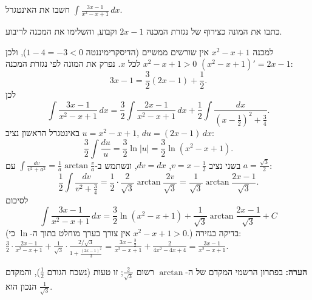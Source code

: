 
\begin{question}
חשבו את האינטגרל $\displaystyle\int\frac{3x-1}{x^2-x+1}\,dx$.
\end{question}

\begin{hint}
כתבו את המונה כצירוף של נגזרת המכנה $2x-1$ וקבוע, והשלימו את המכנה לריבוע.
\end{hint}

\begin{solution}
למכנה $x^2-x+1$ אין שורשים ממשיים (הדיסקרימיננטה $1-4=-3<0$), ולכן $x^2-x+1>0$ לכל $x$. נפרק את המונה לפי נגזרת המכנה $(x^2-x+1)'=2x-1$:
\[ 3x-1=\frac32(2x-1)+\frac12. \]
לכן
\[ \int\frac{3x-1}{x^2-x+1}\,dx=\frac32\int\frac{2x-1}{x^2-x+1}\,dx+\frac12\int\frac{dx}{\left(x-\frac12\right)^2+\frac34}. \]
באינטגרל הראשון נציב $u=x^2-x+1$, $du=(2x-1)\,dx$:
\[ \frac32\int\frac{du}{u}=\frac32\ln|u|=\frac32\ln\left(x^2-x+1\right). \]
בשני נציב $v=x-\frac12$, $dv=dx$, ונשתמש ב-$\int\frac{dv}{v^2+a^2}=\frac1a\arctan\frac va$ עם $a=\frac{\sqrt3}{2}$:
\[ \frac12\int\frac{dv}{v^2+\frac34}=\frac12\cdot\frac{2}{\sqrt3}\arctan\frac{2v}{\sqrt3}=\frac{1}{\sqrt3}\arctan\frac{2x-1}{\sqrt3}. \]
לסיכום
\[ \boxed{\int\frac{3x-1}{x^2-x+1}\,dx=\frac32\ln\left(x^2-x+1\right)+\frac{1}{\sqrt3}\arctan\frac{2x-1}{\sqrt3}+C} \]
(אין צורך בערך מוחלט בתוך ה-$\ln$ כי $x^2-x+1>0$.) בדיקה בגזירה: $\frac32\cdot\frac{2x-1}{x^2-x+1}+\frac1{\sqrt3}\cdot\frac{2/\sqrt3}{1+\frac{(2x-1)^2}{3}}=\frac{3x-\frac32}{x^2-x+1}+\frac{2}{4x^2-4x+4}=\frac{3x-1}{x^2-x+1}$.

\textbf{הערה:} בפתרון הרשמי המקדם של ה-$\arctan$ רשום $\frac{2}{\sqrt3}$; זו טעות (נשכח הגורם $\frac12$), והמקדם הנכון הוא $\frac1{\sqrt3}$.
\end{solution}
